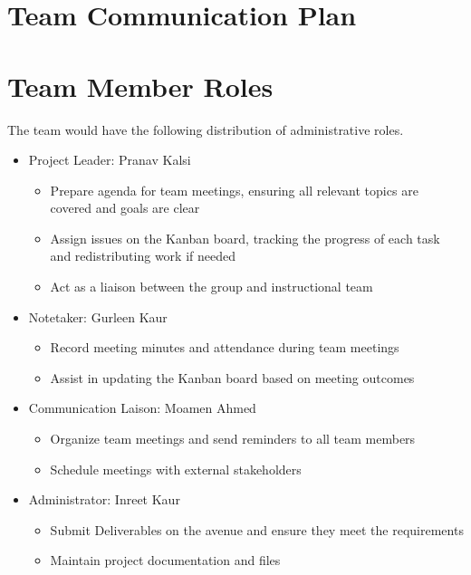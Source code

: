 \documentclass{article}
\begin{document}
\section{Team Communication Plan}


\section{Team Member Roles}
 
The team would have the following distribution of administrative roles.

\begin{itemize}
\item Project Leader: Pranav Kalsi
\begin{itemize}
\item Prepare agenda for team meetings, ensuring all relevant topics are covered and goals are clear
\item Assign issues on the Kanban board, tracking the progress of each task and redistributing work if needed
\item Act as a liaison between the group and instructional team
\end{itemize}

\item Notetaker: Gurleen Kaur
\begin{itemize}
\item Record meeting minutes and attendance during team meetings
\item Assist in updating the Kanban board based on meeting outcomes
\end{itemize}

\item Communication Laison: Moamen Ahmed
\begin{itemize}
\item Organize team meetings and send reminders to all team members
\item Schedule meetings with external stakeholders
\end{itemize}

\item Administrator: Inreet Kaur
\begin{itemize}
\item Submit Deliverables on the avenue and ensure they meet the requirements
\item Maintain project documentation and files
\end{itemize}
\end{itemize} 
\end{document}
